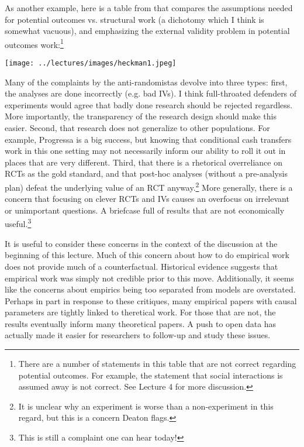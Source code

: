 \documentclass{tufte-handout}
\theoremstyle{break}
\begin{document}
As another example, here is a table from \citet{heckman2010building} that compares the assumptions needed for potential outcomes vs. structural work (a dichotomy which I think is somewhat vacuous), and emphasizing the external validity problem in potential outcomes work:\footnote{There are a number of statements in this table that are not correct regarding potential outcomes. For example, the statement that social interactions is assumed away is not correct. See Lecture 4 for more discussion.}
\begin{figure*}
  \texttt{[image: ../lectures/images/heckman1.jpeg]}
\end{figure*}

Many of the complaints by the anti-randomistas devolve into three types: first, the analyses are done incorrectly (e.g. bad IVs). I think full-throated defenders of experiments would agree that badly done research should be rejected regardless. More importantly, the transparency of the research design should make this easier. Second, that research does not generalize to other populations. For example, Progressa is a big success, but knowing that conditional  cash transfers work in this one setting may not necessarily inform our ability to roll it out in places that are very different. Third, that there is a rhetorical overreliance on RCTs as the gold standard, and that  post-hoc analyses (without a pre-analysis plan) defeat the underlying value of an RCT anyway.\footnote{It is unclear why an experiment is worse than a non-experiment in this regard, but this is a concern Deaton flags.} More generally, there is a concern that focusing on clever RCTs and IVs causes an overfocus on irrelevant or unimportant questions. A briefcase full of results that are not economically useful.\footnote{This is still a complaint one can hear today!}

It is useful to consider these concerns in the context of the discussion at the beginning of this lecture. Much of this concern about how to do empirical work does not provide much of a counterfactual. Historical evidence suggests that empirical work was simply not credible prior to this move. Additionally, it seems like the concerns about empirics being too separated from models are overstated. Perhaps in part in response to these critiques, many empirical papers with causal parameters are  tightly linked to theretical work. For those that are not, the results eventually  inform many theoretical papers. A push to open data has actually made it easier for researchers to follow-up and study these issues. 
\end{document}
